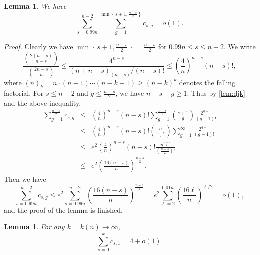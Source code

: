 \documentclass[11pt]{article}
\newtheorem{lemma}[theorem]{Lemma}
\theoremstyle{definition}
\theoremstyle{remark}
\theoremstyle{remark}
\numberwithin{theorem}{section}
\begin{document}
\begin{lemma}\label{lem:large_j}
    We have
	$$
		\sum_{s=0.99n}^{n-2}\sum_{g=1}^{\min\left\{s+1,\frac{n-s}{2}\right\}}c_{s,g} 
        = o(1).
	$$
\end{lemma}

\begin{proof}
	Clearly we have $\min\left\{s+1, \frac{n-s}{2}\right\} = \frac{n-s}{2}$ for $0.99n \leq s \leq n-2$. We write
	$$
            \frac{\binom{2(n-s)}{n-s}}{\binom{2n-s}{n}} \leq \frac{4^{n-s}}{(n+n-s)_{(n-s)}/(n-s)!} \leq \left(\frac{4}{n} \right)^{n-s}(n-s)!,
	$$
        where $(n)_k=n\cdot(n-1)\cdots(n-k+1)\ge(n-k)^k$ denotes the falling factorial.
	For $s \leq n-2$ and $g \leq \frac{n-s}{2}$, we have $n-s-g \geq 1$. Thus by \cref{lem:djk} and the above inequality, 
	\begin{eqnarray*}
            \sum_{g=1}^{\frac{n-s}{2}}c_{s,g} &\leq&  \left(\frac{4}{n} \right)^{n-s}(n-s)!\sum_{g=1}^{\frac{n-s}{2}}\binom{s+1}{g}\frac{2^{g-1}}{(g-1)!}\\
            &\leq& \left(\frac{4}{n} \right)^{n-s}(n-s)!\binom{n}{\frac{n-s}{2}}\sum_{g=1}^{\infty}\frac{2^{g-1}}{(g-1)!}\\
            &\leq& e^{2} \left(\frac{4}{n} \right)^{n-s}(n-s)!\frac{n^{\frac{n-s}{2}}}{\left(\frac{n-s}{2} \right)!}\\
            &\leq& e^{2}\left(\frac{16(n-s)}{n} \right)^{\frac{n-s}{2}}.
	\end{eqnarray*}
	Then we have
	$$
		\sum_{s=0.99n}^{n-2}c_{s,g} \leq e^{2}\sum_{s=0.99n}^{n-2}\left(\frac{16(n-s)}{n} \right)^{\frac{n-s}{2}} = e^{2}\sum_{\ell = 2}^{0.01n}\left(\frac{16\ell}{n} \right)^{\ell/2} = o(1),
	$$
	and the proof of the lemma is finished.
\end{proof}
\begin{lemma}\label{lem:dominant_term}
	For any $k = k(n) \to \infty$, 
	$$
		\sum_{s=0}^{k}c_{s,1} = 4 + o(1).
	$$
\end{lemma}
\end{document}
